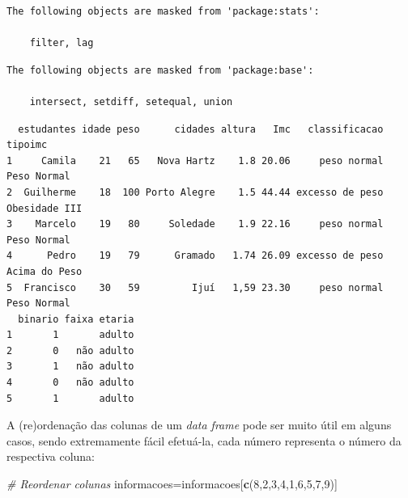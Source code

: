 \documentclass[12pt,brazil,oneside]{book}
\newenvironment{Shaded}{\begin{snugshade}}{\end{snugshade}}
\newcommand{\CommentTok}[1]{\textcolor[rgb]{0.56,0.35,0.01}{\textit{#1}}}
\newcommand{\DecValTok}[1]{\textcolor[rgb]{0.00,0.00,0.81}{#1}}
\newcommand{\KeywordTok}[1]{\textcolor[rgb]{0.13,0.29,0.53}{\textbf{#1}}}
\newcommand{\NormalTok}[1]{#1}
\newcommand{\OperatorTok}[1]{\textcolor[rgb]{0.81,0.36,0.00}{\textbf{#1}}}
\newcommand{\StringTok}[1]{\textcolor[rgb]{0.31,0.60,0.02}{#1}}
\begin{document}
\begin{verbatim}
The following objects are masked from 'package:stats':

    filter, lag
\end{verbatim}

\begin{verbatim}
The following objects are masked from 'package:base':

    intersect, setdiff, setequal, union
\end{verbatim}

\begin{Shaded}
\end{Shaded}

\begin{verbatim}
  estudantes idade peso      cidades altura   Imc   classificacao       tipoimc
1     Camila    21   65   Nova Hartz    1.8 20.06     peso normal   Peso Normal
2  Guilherme    18  100 Porto Alegre    1.5 44.44 excesso de peso Obesidade III
3    Marcelo    19   80     Soledade    1.9 22.16     peso normal   Peso Normal
4      Pedro    19   79      Gramado   1.74 26.09 excesso de peso Acima do Peso
5  Francisco    30   59         Ijuí   1,59 23.30     peso normal   Peso Normal
  binario faixa etaria
1       1       adulto
2       0   não adulto
3       1   não adulto
4       0   não adulto
5       1       adulto
\end{verbatim}

A (re)ordenação das colunas de um \emph{data frame} pode ser muito útil
em alguns casos, sendo extremamente fácil efetuá-la, cada número
representa o número da respectiva coluna:

\begin{Shaded}
\begin{Highlighting}[]
\CommentTok{# Reordenar colunas}
\NormalTok{informacoes=informacoes[}\KeywordTok{c}\NormalTok{(}\DecValTok{8}\NormalTok{,}\DecValTok{2}\NormalTok{,}\DecValTok{3}\NormalTok{,}\DecValTok{4}\NormalTok{,}\DecValTok{1}\NormalTok{,}\DecValTok{6}\NormalTok{,}\DecValTok{5}\NormalTok{,}\DecValTok{7}\NormalTok{,}\DecValTok{9}\NormalTok{)]}
\end{Highlighting}
\end{Shaded}
\end{document}
